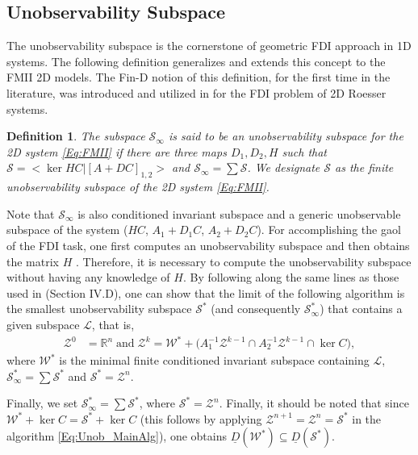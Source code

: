 \documentclass[journal,12pt,draftcls,onecolumn]{IEEEtran}
\newcommand{\ssp}[1]{\mathscr{#1}}      \newcommand{\setssp}[1]{\mathfrak{#1}}   \newcommand{\fld}[1]{\mathbb{#1}}       \newcommand{\op}[1]{\mathcal{#1}}       \newcommand{\sumbanach}[1]{\sum{#1}}
\def\QEDclosed{\hfill\IEEEQEDclosed}
\renewcommand{\qed}{\QEDclosed}
\newtheorem{definition}{Definition}
\begin{document}
\subsection{Unobservability Subspace}
The unobservability subspace \cite{Mass_Thesis, DrMeskin_Delay} is the cornerstone of geometric FDI approach in 1D systems. The following definition generalizes and extends this concept to the FMII 2D models. The Fin-D notion of this definition, for the first time in the literature, was introduced and utilized in \cite{ACC2013} for the FDI problem of 2D Roesser systems. \begin{definition}\label{Def:Unobser}
	The subspace $\op{S}_\infty$ is said to be an unobservability subspace for the 2D system \eqref{Eq:FMII} if there are three maps $D_1,D_2,H$ such that
$\op{S} = <\ker HC|[A+DC]_{1,2}>$ and $\op{S}_\infty =\sum\op{S}$. We designate $\op{S}$ as the finite unobservability subspace of the 2D system \eqref{Eq:FMII}.
\qed
\end{definition}
Note that $\op{S}_\infty$ is also conditioned invariant subspace and a generic unobservable subspace of the system ($HC$, $A_1+D_1C$, $A_2+D_2C$).
For accomplishing the gaol of the FDI task, one first computes an unobservability subspace and then obtains the matrix $H$ \cite{Mass_Thesis}. Therefore, it is necessary to compute the unobservability subspace without having any knowledge of $H$. By following along the same lines as those used in \cite{ACC2013} (Section IV.D), one can show that the limit of the following algorithm is the smallest unobservability subspace $\op{S}^*$ (and consequently $\op{S}_\infty^*$) that contains a given subspace $\ssp{L}$, that is,
\begin{equation}\label{Eq:Unob_MainAlg}
	\begin{split}
		\ssp{Z}^0 &= \fld{R}^{n}\; \text{and}\;
		\ssp{Z}^{k} = \ssp{W}^{*} + \big( A_1^{-1}\ssp{Z}^{k-1} \cap A_2^{-1}\ssp{Z}^{k-1} \cap \ker C\big),
	\end{split}
\end{equation}
where $\ssp{W}^{*}$ is the minimal finite conditioned invariant subspace containing $\ssp{L}$, $\op{S}_\infty^*=\sum \op{S}^*$ and $\op{S}^* = \ssp{Z}^n$.

Finally, we set $\op{S}_\infty^*=\sum \op{S}^*$, where $\op{S}^* = \ssp{Z}^n$. Finally, it should be noted that since $\ssp{W}^*+\ker C = \op{S}^*+\ker C$ (this follows by applying $\ssp{Z}^{n+1} = \ssp{Z}^n = \op{S}^*$ in the algorithm \eqref{Eq:Unob_MainAlg}), one obtains $\underline{D}(\ssp{W}^*)\subseteq\underline{D}(\op{S}^*)$.
\end{document}

